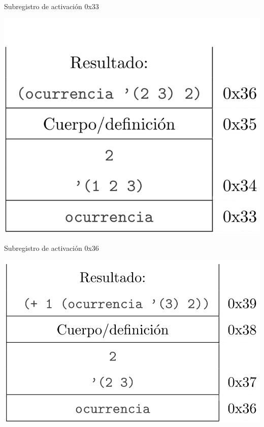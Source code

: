 \begin{multicols}{2}
Subregistro de activación 0x33
\begin{center}
        \includegraphics[scale=0.25]{./R7}
\end{center}

Subregistro de activación 0x36
\begin{center}
        \includegraphics[scale=0.25]{./R8}
\end{center}


\end{multicols}
